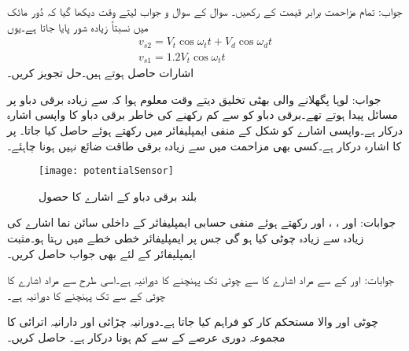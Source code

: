 جواب: تمام مزاحمت برابر قیمت کے رکھیں۔
سوال  کے سوال و جواب لیتے وقت دیکھا گیا کہ دُور مائک میں نسبتاً زیادہ شور پایا جاتا ہے۔یوں
\begin{align*}
v_{s2}=V_t \cos \omega_t t +V_d \cos \omega_d t\\
v_{s1}=1.2 V_t \cos \omega_t t
\end{align*} 
اشارات حاصل ہوتے ہیں۔حل تجویز کریں۔

جواب: 
لوہا پگھلانے والی بھٹی تخلیق دیتے وقت معلوم ہوا کہ  سے زیادہ برقی دباو پر مسائل پیدا ہوتے تھے۔برقی دباو  کو  سے کم رکھنے کی خاطر برقی دباو کا واپسی اشارہ درکار ہے۔واپسی اشارے کو شکل  کے منفی ایمپلیفائر میں  رکھتے ہوئے حاصل کیا جاتا۔ پر  کا اشارہ درکار ہے۔کسی بھی مزاحمت میں  سے زیادہ برقی طاقت ضائع نہیں ہونا چاہئے۔ 
\begin{figure}
\centering
\texttt{[image: potentialSensor]}
\caption{بلند برقی دباو کے اشارے کا حصول}
\label{شکل_سوال_بلند_برقی_دباو_اشارہ}
\end{figure}

جوابات: اور 
، ،  اور  رکھتے ہوئے منفی حسابی ایمپلیفائر کے داخلی سائن نما اشارے کی زیادہ سے زیادہ چوٹی کیا ہو گی جس پر ایمپلیفائر خطی خطے میں رہتا ہو۔مثبت ایمپلیفائر کے لئے بھی جواب حاصل کریں۔

جوابات:   اور  
 کے  سے مراد اشارے کا   سے   چوٹی تک پہنچنے کا دورانیہ ہے۔اسی طرح  سے مراد اشارے کا  چوٹی کے  سے  تک پہنچنے کا دورانیہ ہے۔

 چوٹی اور   والا  مستحکم کار کو فراہم کیا جاتا ہے۔دورانیہ چڑائی اور دارانیہ اترائی کا مجموعہ دوری عرصے کے  سے کم ہونا درکار ہے۔ حاصل کریں۔ 

